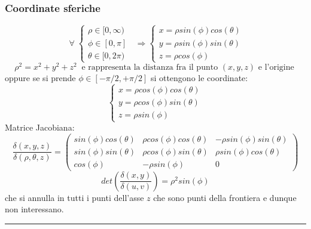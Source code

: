 \subsubsection*{Coordinate sferiche}
\[
    \;\forall\; \begin{cases}
        \rho \in [0,\infty)\\
        \phi \in [0,\pi]\\
        \theta \in [0,2\pi)
    \end{cases} \;\; \Longrightarrow \begin{cases}
        x = \rho sin(\phi) cos(\theta)\\
        y = \rho sin(\phi) sin(\theta)\\
        z = \rho cos(\phi)
    \end{cases}
\]
\[
    \rho^2 = x^2 +y^2+z^2 \;\; \text{e rappresenta la distanza fra il punto $(x,y,z)$ e l'origine}\;
\]
oppure se si prende $\phi \in [-\pi /2, + \pi/2]$ si ottengono le coordinate:
\[
    \begin{cases}
        x = \rho cos(\phi) cos(\theta)\\
        y = \rho cos(\phi) sin(\theta)\\
        z = \rho sin(\phi)
    \end{cases}
\]
Matrice Jacobiana:
\[
    \frac{\delta(x,y,z)}{\delta(\rho,\theta,z)} = \left(
        \begin{matrix}
            sin(\phi) cos(\theta) & \rho cos(\phi) cos(\theta) & -\rho sin(\phi) sin(\theta)\\ 
            sin(\phi) sin(\theta) & \rho cos(\phi) sin(\theta) & \rho sin(\phi) cos(\theta) \\ 
            cos(\phi) & -\rho sin(\phi) & 0
        \end{matrix}\right)
\]
\[
    det(\frac{\delta(x,y)}{\delta(u,v)}) = \rho^2 sin(\phi)
\]
che si annulla in tutti i punti dell'asse $z$ che sono punti della frontiera e dunque non interessano.\newline
\rule{\textwidth}{2pt}
